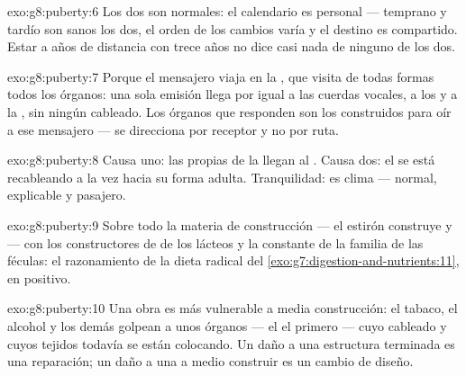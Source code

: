\begin{solution}{exo:g8:puberty:6}
Los dos son normales: el calendario es personal --- temprano y tardío
son sanos los dos, el orden de los cambios varía y el destino es
compartido. Estar a años de distancia con trece años no dice casi nada
de ninguno de los dos.
\end{solution}

\begin{solution}{exo:g8:puberty:7}
Porque el mensajero viaja en la , que visita de todas formas
todos los órganos: una sola emisión llega por igual a las cuerdas
vocales, a los  y a la , sin ningún cableado. Los órganos
que responden son los construidos para oír a ese mensajero --- se
direcciona por receptor y no por ruta.
\end{solution}

\begin{solution}{exo:g8:puberty:8}
Causa uno: las propias  de la  llegan al . Causa
dos: el  se está recableando a la vez hacia su forma adulta.
Tranquilidad: es clima --- normal, explicable y pasajero.
\end{solution}

\begin{solution}{exo:g8:puberty:9}
Sobre todo la materia de construcción --- el estirón construye  y
 --- con los constructores de  de los lácteos y la 
constante de la familia de las féculas: el razonamiento de la dieta
radical del \cref{exo:g7:digestion-and-nutrients:11}, en positivo.
\end{solution}

\begin{solution}{exo:g8:puberty:10}
Una obra es más vulnerable a media construcción: el tabaco, el alcohol
y los demás golpean a unos órganos --- el  el primero --- cuyo
cableado y cuyos tejidos todavía se están colocando. Un daño a una
estructura terminada es una reparación; un daño a una a medio construir
es un cambio de diseño.
\end{solution}


